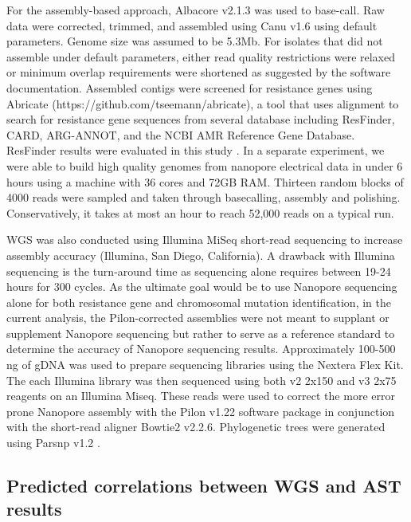For the assembly-based approach, Albacore v2.1.3 was used to base-call. Raw data were corrected, trimmed, and assembled using Canu v1.6 \citep{Koren2017-wf} using default parameters. Genome size was assumed to be 5.3Mb. For isolates that did not assemble under default parameters, either read quality restrictions were relaxed or minimum overlap requirements were shortened as suggested by the software documentation. Assembled contigs were screened for resistance genes using Abricate (https://github.com/tseemann/abricate), a tool that uses alignment to search for resistance gene sequences from several database including ResFinder, CARD, ARG-ANNOT, and the NCBI AMR Reference Gene Database. ResFinder results were evaluated in this study \citep{Zankari2012-uk}. In a separate experiment, we were able to build high quality genomes from nanopore electrical data in under 6 hours using a machine with 36 cores and 72GB RAM. Thirteen random blocks of 4000 reads were sampled and taken through basecalling, assembly and polishing. Conservatively, it takes at most an hour to reach 52,000 reads on a typical run.

WGS was also conducted using Illumina MiSeq short-read sequencing to increase assembly accuracy (Illumina, San Diego, California). A drawback with Illumina sequencing is the turn-around time as sequencing alone requires between 19-24 hours for 300 cycles. As the ultimate goal would be to use Nanopore sequencing alone for both resistance gene and chromosomal mutation identification, in the current analysis, the Pilon-corrected assemblies were not meant to supplant or supplement Nanopore sequencing but rather to serve as a reference standard to determine the accuracy of Nanopore sequencing results. Approximately 100-500 ng of gDNA was used to prepare sequencing libraries using the Nextera Flex Kit. The each Illumina library was then sequenced using both v2 2x150 and v3 2x75 reagents on an Illumina Miseq. These reads were used to correct the more error prone Nanopore assembly with the Pilon v1.22 software package in conjunction with the short-read aligner Bowtie2 v2.2.6. Phylogenetic trees were generated using Parsnp v1.2 \citep{Treangen2014-bu}.

\subsection{Predicted correlations between WGS and AST results}
\label{sec:wgsast}

